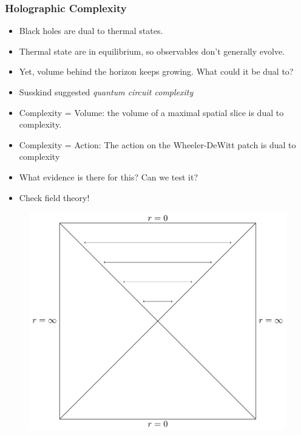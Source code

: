 \documentclass[10pt,aspectratio=169]{beamer}
\begin{document}
\begin{frame}
\frametitle{Holographic Complexity}

\begin{minipage}[t]{0.48\linewidth}

\begin{itemize}

\item Black holes are dual to thermal states.

\item Thermal state are in equilibrium, so observables don't generally evolve.

\item Yet, volume behind the horizon keeps growing. What could it be dual to?

\item Susskind suggested {\it quantum circuit complexity}

\item Complexity = Volume: the volume of a maximal spatial slice is dual to complexity.

\item Complexity = Action: The action on the Wheeler-DeWitt patch is dual to complexity

\item What evidence is there for this? Can we test it? 

\item Check field theory!

\end{itemize}

\end{minipage}
%
\hfill
%
\begin{minipage}[t]{0.48\linewidth}

\begin{figure}
    \begin{center}
    
        \includegraphics[scale=0.3]{WormholeGrowth}    
    

\end{center}
\end{figure}
\end{minipage}
\end{frame}
\end{document}
